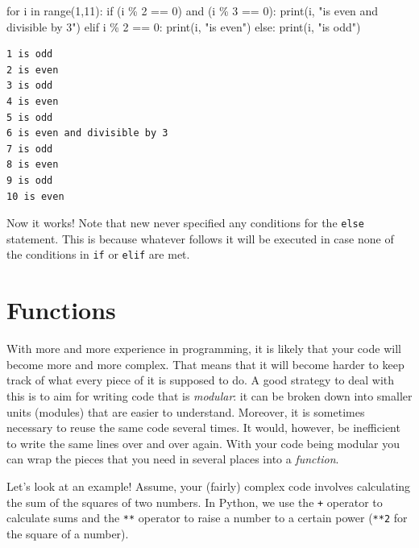 \documentclass[
  a4paperpaper,
  ,captions=tableheading
]{scrbook}
\newenvironment{Shaded}{\begin{snugshade}}{\end{snugshade}}
\newcommand{\BuiltInTok}[1]{\textcolor[rgb]{0.00,0.23,0.31}{#1}}
\newcommand{\ControlFlowTok}[1]{\textcolor[rgb]{0.00,0.23,0.31}{#1}}
\newcommand{\DecValTok}[1]{\textcolor[rgb]{0.68,0.00,0.00}{#1}}
\newcommand{\KeywordTok}[1]{\textcolor[rgb]{0.00,0.23,0.31}{#1}}
\newcommand{\NormalTok}[1]{\textcolor[rgb]{0.00,0.23,0.31}{#1}}
\newcommand{\OperatorTok}[1]{\textcolor[rgb]{0.37,0.37,0.37}{#1}}
\newcommand{\StringTok}[1]{\textcolor[rgb]{0.13,0.47,0.30}{#1}}
\begin{document}
\begin{Shaded}
\begin{Highlighting}[]
\ControlFlowTok{for}\NormalTok{ i }\KeywordTok{in} \BuiltInTok{range}\NormalTok{(}\DecValTok{1}\NormalTok{,}\DecValTok{11}\NormalTok{):}
    \ControlFlowTok{if}\NormalTok{ (i }\OperatorTok{\%} \DecValTok{2} \OperatorTok{==} \DecValTok{0}\NormalTok{) }\KeywordTok{and}\NormalTok{ (i }\OperatorTok{\%} \DecValTok{3} \OperatorTok{==} \DecValTok{0}\NormalTok{):}
        \BuiltInTok{print}\NormalTok{(i, }\StringTok{"is even and divisible by 3"}\NormalTok{)}
    \ControlFlowTok{elif}\NormalTok{ i }\OperatorTok{\%} \DecValTok{2} \OperatorTok{==} \DecValTok{0}\NormalTok{:}
        \BuiltInTok{print}\NormalTok{(i, }\StringTok{"is even"}\NormalTok{)}
    \ControlFlowTok{else}\NormalTok{:}
        \BuiltInTok{print}\NormalTok{(i, }\StringTok{"is odd"}\NormalTok{)}
\end{Highlighting}
\end{Shaded}

\begin{verbatim}
1 is odd
2 is even
3 is odd
4 is even
5 is odd
6 is even and divisible by 3
7 is odd
8 is even
9 is odd
10 is even
\end{verbatim}

Now it works! Note that new never specified any conditions for the
\texttt{else} statement. This is because whatever follows it will be
executed in case none of the conditions in \texttt{if} or \texttt{elif}
are met.

\hypertarget{functions}{%
\section{Functions}\label{functions}}

With more and more experience in programming, it is likely that your
code will become more and more complex. That means that it will become
harder to keep track of what every piece of it is supposed to do. A good
strategy to deal with this is to aim for writing code that is
\emph{modular}: it can be broken down into smaller units (modules) that
are easier to understand. Moreover, it is sometimes necessary to reuse
the same code several times. It would, however, be inefficient to write
the same lines over and over again. With your code being modular you can
wrap the pieces that you need in several places into a \emph{function}.

Let's look at an example! Assume, your (fairly) complex code involves
calculating the sum of the squares of two numbers. In Python, we use the
\texttt{+} operator to calculate sums and the \texttt{**} operator to
raise a number to a certain power (\texttt{**2} for the square of a
number).
\end{document}
